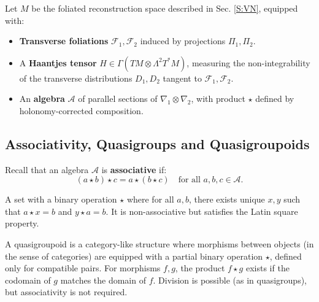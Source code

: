 \documentclass[runningheads]{llncs}
\begin{document}
\subsubsection{}\label{S:QNI} Let \( M \) be the foliated reconstruction space described in Sec. \ref{S:VN}, equipped with:
\begin{itemize}
    \item {\bf Transverse foliations} \( \mathcal{F}_1, \mathcal{F}_2 \) induced by projections \( \Pi_1, \Pi_2 \).
    \item A {\bf Haantjes tensor} \( H \in \Gamma(TM \otimes \Lambda^2 T^*M) \), measuring the non-integrability of the transverse distributions \( D_1, D_2 \) tangent to \( \mathcal{F}_1, \mathcal{F}_2 \). 
    
 \item An  {\bf  algebra } \( \mathcal{A} \) of parallel sections of \( \nabla_1 \otimes \nabla_2 \), with product \( \star \) defined by holonomy-corrected composition.
\end{itemize}

\subsection{Associativity, Quasigroups and Quasigroupoids} 
Recall that an algebra \( \mathcal{A} \) is {\bf associative} if:
\[
(a \star b) \star c = a \star (b \star c) \quad \text{for all } a, b, c \in \mathcal{A}. 
\]


\smallskip 

A set with a binary operation $\star$ where for all $a,b$, there exists unique $x,y$ such that $a\star x=b$ and $y\star a=b$. It is non-associative but satisfies the Latin square property.

\smallskip 

 A quasigroupoid is a category-like structure where morphisms between objects (in the sense of categories) are equipped with a partial binary operation $\star$, defined only for compatible pairs. 
For morphisms $f,g$, the product $f\star g$ exists if the codomain of $g$ matches the domain of $f$. Division is possible (as in quasigroups), but associativity is not required.
\end{document}
